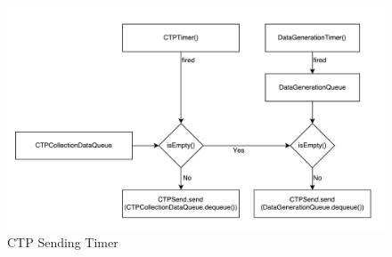     \begin{figure}
    \centering
    \includegraphics[width=1.0\textwidth]{gfx/CTPSendingTimer.pdf}
    \caption{\ac{CTP} Sending Timer}
    \label{fig:CTPSendingTimer}
    \end{figure}

    

